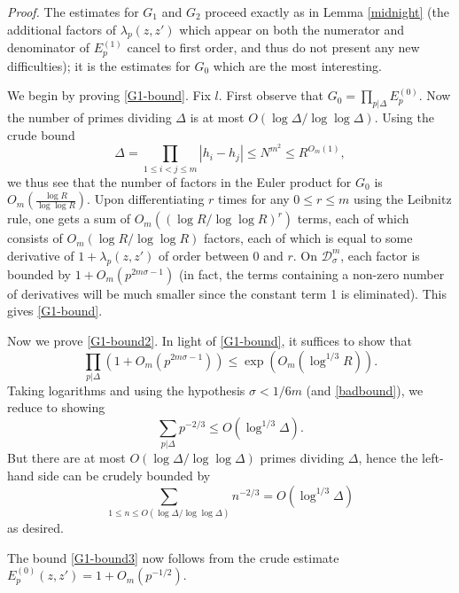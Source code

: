 \documentclass[12pt,a4paper,reqno]{amsart}
\numberwithin{equation}{section}
\theoremstyle{plain}
\theoremstyle{definition}
\renewcommand{\leq}{\leqslant}
\def\D{{\mathcal D}}
\def\vs{\vspace{11pt}}
\def\ni{\noindent}
\def\proof{\noindent\textit{Proof. }}
\def\endproof{\hfill{\usebox{\proofbox}}}
\begin{document}
\proof  The estimates for $G_1$ and $G_2$ proceed exactly as in
Lemma \ref{midnight} (the additional factors of $\lambda_p(z,z')$ which
appear on both the numerator and denominator of $E_p^{(1)}$ cancel to
first order, and thus do not present any new difficulties); it is the
estimates for $G_0$ which are the most interesting.\vs

\ni We begin by proving \eqref{G1-bound}.  Fix $l$.
First observe that $G_0 = \prod_{p | \Delta} E_p^{(0)}$.  Now the number of
primes dividing $\Delta$ is at most $O(\log \Delta / \log \log \Delta)$.
Using the crude bound
\begin{equation}\label{badbound} 
\Delta = \prod_{1 \leq i < j \leq m}|h_i - h_j| 
\leq N^{m^2} \leq R^{O_m(1)},
\end{equation} 
we thus see that the number of factors in the Euler product for $G_0$
is $O_m(\frac{\log R}{\log\log R})$. Upon differentiating $r$ times for any $0 \leq r \leq m$ using the Leibnitz rule, one gets a 
sum of $O_m((\log R/\log \log R)^r)$ terms, each of which
consists of $O_m(\log R/\log\log R)$ factors, each of which is equal to some derivative of
$1 + \lambda_p(z,z')$ of order between 0 and $r$.
On $\D^m_\sigma$, each factor is bounded by $1 + O_m(p^{2m\sigma-1})$ (in fact, the terms containing a non-zero number of derivatives will be much smaller
since the constant term 1 is eliminated).  This gives \eqref{G1-bound}.\vs

\ni Now we prove \eqref{G1-bound2}.  In light of \eqref{G1-bound}, it suffices
to show that
\[
\prod_{p | \Delta} (1  + O_m(p^{2m\sigma - 1}))
\leq \exp( O_m(\log^{1/3} R)).\]
Taking logarithms and using the hypothesis $\sigma < 1/6m$ (and 
\eqref{badbound}), we reduce to showing
\[ \sum_{p | \Delta} p^{-2/3} \leq O(\log^{1/3} \Delta).\]
But there are at most $O(\log \Delta/ \log \log \Delta)$ primes dividing
$\Delta$, hence the left-hand side can be crudely bounded by
\[ \sum_{1 \leq n \leq O(\log \Delta/\log\log\Delta)} n^{-2/3} = O(\log^{1/3} \Delta)\]
as desired.\vs

\ni The bound \eqref{G1-bound3} now follows from the crude
estimate $E_p^{(0)}(z,z') = 1 + O_m( p^{-1/2})$.
\endproof\vspace{11pt}
\end{document}
